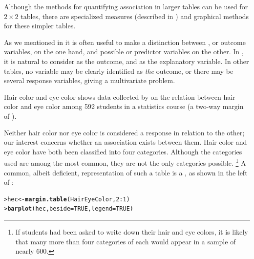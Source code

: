 \documentclass[10pt,krantz2]{krantz}\usepackage[]{graphicx}\usepackage[]{color}
\makeatletter
\newcommand{\hlnum}[1]{\textcolor[rgb]{0.686,0.059,0.569}{#1}}%
\newcommand{\hlopt}[1]{\textcolor[rgb]{0,0,0}{#1}}%
\newcommand{\hlstd}[1]{\textcolor[rgb]{0.345,0.345,0.345}{#1}}%
\newcommand{\hlkwb}[1]{\textcolor[rgb]{0.69,0.353,0.396}{#1}}%
\newcommand{\hlkwc}[1]{\textcolor[rgb]{0.333,0.667,0.333}{#1}}%
\newcommand{\hlkwd}[1]{\textcolor[rgb]{0.737,0.353,0.396}{\textbf{#1}}}%
\newenvironment{kframe}{%
 \def\at@end@of@kframe{}%
 \ifinner\ifhmode%
  \def\at@end@of@kframe{\end{minipage}}%
  \begin{minipage}{\columnwidth}%
 \fi\fi%
 \def\FrameCommand##1{\hskip\@totalleftmargin \hskip-\fboxsep
 \colorbox{shadecolor}{##1}\hskip-\fboxsep
     \hskip-\linewidth \hskip-\@totalleftmargin \hskip\columnwidth}%
 \MakeFramed {\advance\hsize-\width
   \@totalleftmargin\z@ \linewidth\hsize
   \@setminipage}}%
 {\par\unskip\endMakeFramed%
 \at@end@of@kframe}
\newenvironment{knitrout}{}{} %
\renewenvironment{knitrout}{\small\renewcommand{\baselinestretch}{.85}}{} %
\makeatother
\begin{document}
Although the methods for quantifying association in larger tables can be
used for $2 \times 2$ tables, there are specialized measures
(described in ) and
graphical methods for these simpler tables.

As we mentioned in 
it is often useful to make a distinction between ,
or outcome variables, on the one hand,
and possible 
or predictor variables on the other.
In , it is natural to consider 
as the outcome, and  as the explanatory variable.
In other tables, no variable may be clearly identified as \emph{the}
outcome, or there may be several response variables, giving a
multivariate problem.

\begin{Example}[haireye1]{Hair color and eye color}
 shows data collected by
\citet{Snee:74}
on the relation between hair color and eye color among 592
students in a statistics course
(a two-way margin of ).

Neither hair color nor eye color
is considered a response in relation to the other;  our interest concerns
whether an association exists between them.
Hair color and eye color have both been classified
into four categories.  Although the categories used are among the most
common, they are not the only categories possible.%
\footnote{If students had been asked to write down their hair and eye
colors, it is likely that many more than four categories of each
would appear in a sample of nearly 600.}
A common, albeit deficient, representation of such a table is a
, as shown in the left of : 
\begin{knitrout}
\color{fgcolor}\begin{kframe}
\begin{alltt}
\hlstd{> }\hlstd{hec} \hlkwb{<-} \hlkwd{margin.table}\hlstd{(HairEyeColor,} \hlnum{2}\hlopt{:}\hlnum{1}\hlstd{)}
\hlstd{> }\hlkwd{barplot}\hlstd{(hec,} \hlkwc{beside} \hlstd{=} \hlnum{TRUE}\hlstd{,} \hlkwc{legend} \hlstd{=} \hlnum{TRUE}\hlstd{)}
\end{alltt}
\end{kframe}
\end{knitrout}
\begin{knitrout}
\color{fgcolor}\begin{figure}[!htbp]


\end{figure}
\end{knitrout}
\end{Example}
\end{document}
